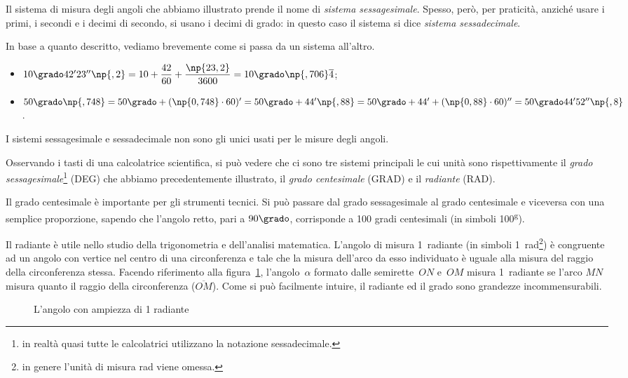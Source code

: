 Il sistema di misura degli angoli che abbiamo illustrato prende il 
nome di \emph{sistema sessagesimale}. Spesso, però, per praticità, 
anziché usare i primi, i secondi e i decimi di secondo, si usano i 
decimi di grado: in questo caso il sistema si dice \emph{sistema 
sessadecimale}.

In base a quanto descritto, vediamo brevemente come si passa da un 
sistema all'altro.

\begin{itemize}
\item \(10\grado 42' 23''\np{,2} = 
10+\dfrac{42}{60}+\dfrac{\np{23,2}}{3600} = 
10\grado\np{,706}\overline{4}\);
\item \(50\grado\np{,748} = 50\grado + (\np{0,748}\cdot 60)'=50\grado 
+ 44'\np{,88} = 50\grado + 44'+(\np{0,88}\cdot 60)'' = 50\grado 44' 
52''\np{,8}\).
\end{itemize}

I sistemi sessagesimale e sessadecimale non sono gli unici usati per 
le misure degli angoli.

Osservando i tasti di una calcolatrice scientifica, si può vedere che 
ci sono tre sistemi principali le cui unità sono rispettivamente il 
\emph{grado sessagesimale}\footnote{in realtà quasi tutte le 
calcolatrici utilizzano la notazione sessadecimale.} (DEG) che 
abbiamo precedentemente illustrato, il \emph{grado centesimale} 
(GRAD) e il \emph{radiante} (RAD).

Il grado centesimale è importante per gli strumenti tecnici. Si può 
passare dal grado sessagesimale al grado centesimale e viceversa con 
una semplice proporzione, sapendo che l'angolo retto, pari a 
\(90\grado\), corrisponde a 100 gradi centesimali (in simboli 
100\textsuperscript{g}).

Il radiante è utile nello studio della trigonometria e dell'analisi 
matematica. L'angolo di misura 1~radiante (in simboli 
1~rad\footnote{in genere l'unità di misura rad viene omessa.}) è 
congruente ad un angolo con vertice nel centro di una circonferenza e 
tale che la misura dell'arco da esso individuato è uguale alla misura 
del raggio della circonferenza stessa.
Facendo riferimento alla figura~\ref{fig:radiante}, l'angolo~\(\alpha\) 
formato dalle semirette~\(ON\) e~\(OM\) misura 1~radiante se l'arco \(MN\) 
misura quanto il raggio della circonferenza (\(\overline{OM}\)). Come 
si può facilmente intuire, il radiante ed il grado sono grandezze 
incommensurabili.


\begin{inaccessibleblock}
 \begin{figure}[htb]
\centering
\caption{L'angolo con ampiezza di 1 radiante}\label{fig:radiante}
\end{figure}
\end{inaccessibleblock}

